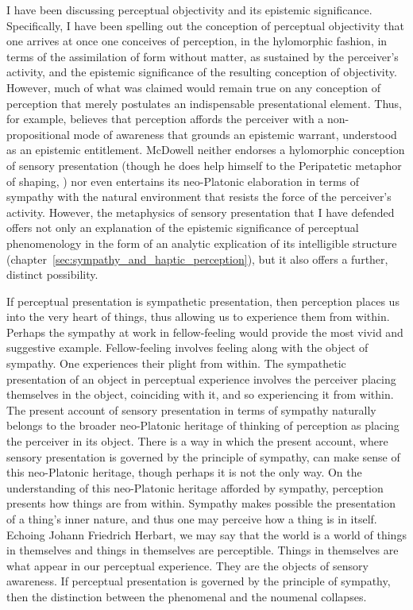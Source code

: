 I have been discussing perceptual objectivity and its epistemic significance. Specifically, I have been spelling out the conception of perceptual objectivity that one arrives at once one conceives of perception, in the hylomorphic fashion, in terms of the assimilation of form without matter, as sustained by the perceiver's activity, and the epistemic significance of the resulting conception of objectivity. However, much of what was claimed would remain true on any conception of perception that merely postulates an indispensable presentational element. Thus, for example, \citet{McDowell:2008fk} believes that perception affords the perceiver with a non-propositional mode of awareness that grounds an epistemic warrant, understood as an epistemic entitlement. McDowell neither endorses a hylomorphic conception of sensory presentation (though he does help himself to the Peripatetic metaphor of shaping, \citealt{McDowell:1998vn}) nor even entertains its neo-Platonic elaboration in terms of sympathy with the natural environment that resists the force of the perceiver's activity. However, the metaphysics of sensory presentation that I have defended offers not only an explanation of the epistemic significance of perceptual phenomenology in the form of an analytic explication of its intelligible structure (chapter~\ref{sec:sympathy_and_haptic_perception}), but it also offers a further, distinct possibility.

If perceptual presentation is sympathetic presentation, then perception places us into the very heart of things, thus allowing us to experience them from within.  Perhaps the sympathy at work in fellow-feeling would provide the most vivid and suggestive example. Fellow-feeling involves feeling along with the object of sympathy. One experiences their plight from within. The sympathetic presentation of an object in perceptual experience involves the perceiver placing themselves in the object, coinciding with it, and so experiencing it from within. The present account of sensory presentation in terms of sympathy naturally belongs to the broader neo-Platonic heritage of thinking of perception as placing the perceiver in its object. There is a way in which the present account, where sensory presentation is governed by the principle of sympathy, can make sense of this neo-Platonic heritage, though perhaps it is not the only way. On the understanding of this neo-Platonic heritage afforded by sympathy, perception presents how things are from within. Sympathy makes possible the presentation of a thing's inner nature, and thus one may perceive how a thing is in itself. Echoing Johann Friedrich Herbart, we may say that the world is a world of things in themselves and things in themselves are perceptible. Things in themselves are what appear in our perceptual experience. They are the objects of sensory awareness. If perceptual presentation is governed by the principle of sympathy, then the distinction between the phenomenal and the noumenal collapses.

